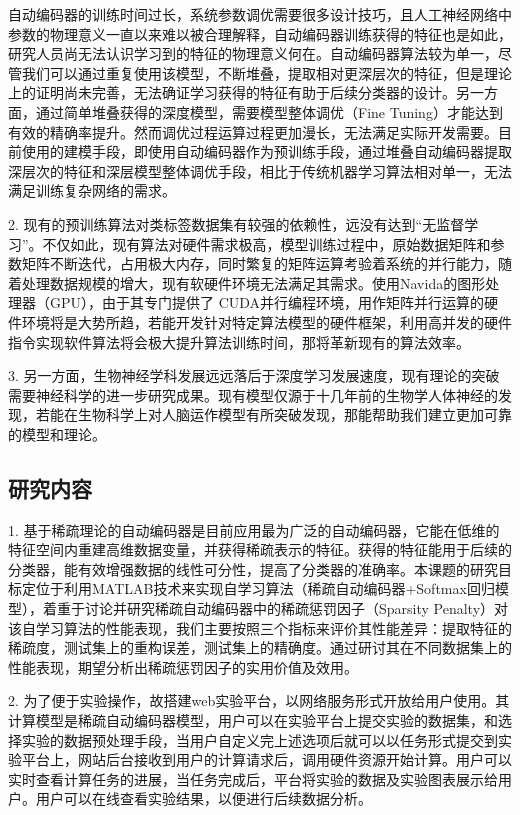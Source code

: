 \documentclass[oneside]{ZJUthesis}
\begin{document}
自动编码器的训练时间过长，系统参数调优需要很多设计技巧，且人工神经网络中参数的物理意义一直以来难以被合理解释，自动编码器训练获得的特征也是如此，研究人员尚无法认识学习到的特征的物理意义何在。自动编码器算法较为单一，尽管我们可以通过重复使用该模型，不断堆叠，提取相对更深层次的特征，但是理论上的证明尚未完善，无法确证学习获得的特征有助于后续分类器的设计。另一方面，通过简单堆叠获得的深度模型，需要模型整体调优（Fine Tuning）才能达到有效的精确率提升。然而调优过程运算过程更加漫长，无法满足实际开发需要。目前使用的建模手段，即使用自动编码器作为预训练手段，通过堆叠自动编码器提取深层次的特征和深层模型整体调优手段，相比于传统机器学习算法相对单一，无法满足训练复杂网络的需求\cite{40}。

2. 现有的预训练算法对类标签数据集有较强的依赖性，远没有达到``无监督学习''\cite{41}。不仅如此，现有算法对硬件需求极高，模型训练过程中，原始数据矩阵和参数矩阵不断迭代，占用极大内存，同时繁复的矩阵运算考验着系统的并行能力，随着处理数据规模的增大，现有软硬件环境无法满足其需求。使用Navida的图形处理器（GPU），由于其专门提供了 CUDA并行编程环境，用作矩阵并行运算的硬件环境将是大势所趋，若能开发针对特定算法模型的硬件框架，利用高并发的硬件指令实现软件算法将会极大提升算法训练时间，那将革新现有的算法效率\cite{43}。

3. 另一方面，生物神经学科发展远远落后于深度学习发展速度，现有理论的突破需要神经科学的进一步研究成果\cite{36,37}。现有模型仅源于十几年前的生物学人体神经的发现，若能在生物科学上对人脑运作模型有所突破发现，那能帮助我们建立更加可靠的模型和理论。

\subsection{研究内容}
1. 基于稀疏理论的自动编码器是目前应用最为广泛的自动编码器，它能在低维的特征空间内重建高维数据变量，并获得稀疏表示的特征。获得的特征能用于后续的分类器，能有效增强数据的线性可分性，提高了分类器的准确率。本课题的研究目标定位于利用MATLAB技术来实现自学习算法（稀疏自动编码器+Softmax回归模型），着重于讨论并研究稀疏自动编码器中的稀疏惩罚因子（Sparsity Penalty）对该自学习算法的性能表现，我们主要按照三个指标来评价其性能差异：提取特征的稀疏度，测试集上的重构误差，测试集上的精确度。通过研讨其在不同数据集上的性能表现，期望分析出稀疏惩罚因子的实用价值及效用。

2. 为了便于实验操作，故搭建web实验平台，以网络服务形式开放给用户使用。其计算模型是稀疏自动编码器模型，用户可以在实验平台上提交实验的数据集，和选择实验的数据预处理手段，当用户自定义完上述选项后就可以以任务形式提交到实验平台上，网站后台接收到用户的计算请求后，调用硬件资源开始计算。用户可以实时查看计算任务的进展，当任务完成后，平台将实验的数据及实验图表展示给用户。用户可以在线查看实验结果，以便进行后续数据分析。
\end{document}
